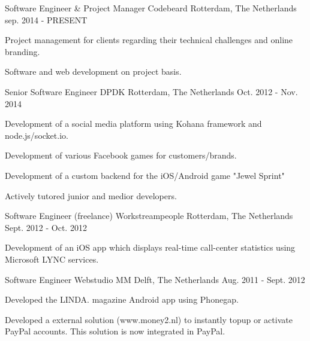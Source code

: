 \begin{cventries}
  \cventry
    {Software Engineer \& Project Manager} %
    {Codebeard} %
    {Rotterdam, The Netherlands} %
    {sep. 2014 - PRESENT} %
    {
      \begin{cvitems} %
        \item {Project management for clients regarding their technical challenges and online branding.}
        \item {Software and web development on project basis.}
      \end{cvitems}
    }
    
  \cventry
    {Senior Software Engineer} %
    {DPDK} %
    {Rotterdam, The Netherlands} %
    {Oct. 2012 - Nov. 2014} %
    {
      \begin{cvitems} %
        \item {Development of a social media platform using Kohana framework and node.js/socket.io.}
        \item {Development of various Facebook games for customers/brands.}
        \item {Development of a custom backend for the iOS/Android game "Jewel Sprint"}
        \item {Actively tutored junior and medior developers.}
      \end{cvitems}
    }

  \cventry
    {Software Engineer (freelance)} %
    {Workstreampeople} %
    {Rotterdam, The Netherlands} %
    {Sept. 2012 - Oct. 2012} %
    {
      \begin{cvitems} %
        \item {Development of an iOS app which displays real-time call-center statistics using Microsoft LYNC services.}
      \end{cvitems}
    }

  \cventry
    {Software Engineer} %
    {Webstudio MM} %
    {Delft, The Netherlands} %
    {Aug. 2011 - Sept. 2012} %
    {
      \begin{cvitems} %
        \item {Developed the LINDA. magazine Android app using Phonegap.}
        \item {Developed a external solution (www.money2.nl) to instantly topup or activate PayPal accounts. This solution is now integrated in PayPal.}
      \end{cvitems}
    }


\end{cventries}
